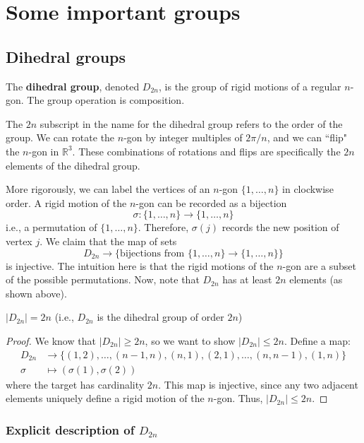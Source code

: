 \documentclass{article}
\theoremstyle{plain}
\newcommand{\R}{\mathbb{R}}
\begin{document}
\section{Some important groups}
\subsection{Dihedral groups}
\begin{definition}{}{}
The \textbf{dihedral group}, denoted $D_{2n}$, is the group of rigid motions of a regular $n$-gon. The group operation is composition.
\end{definition}
The $2n$ subscript in the name for the dihedral group refers to the order of the group. We can rotate the $n$-gon by integer multiples of $2\pi/n$, and we can ``flip" the $n$-gon in $\R^3$. These combinations of rotations and flips are specifically the $2n$ elements of the dihedral group.

More rigorously, we can label the vertices of an $n$-gon $\{1,\ldots,n\}$ in clockwise order. A rigid motion of the $n$-gon can be recorded as a bijection $$\sigma : \{1,\ldots,n\}\rightarrow\{1,\ldots,n\}$$
i.e., a permutation of $\{1,\ldots,n\}$. Therefore, $\sigma(j)$ records the new position of vertex $j$. We claim that the map of sets $$D_{2n}\rightarrow \{\text{bijections from } \{1,\ldots,n\} \rightarrow \{1,\ldots,n\}\}$$
is injective. The intuition here is that the rigid motions of the $n$-gon are a subset of the possible permutations. Now, note that $D_{2n}$ has at least $2n$ elements (as shown above).
\begin{theorem}{}{}
$|D_{2n}| = 2n$ (i.e., $D_{2n}$ is the dihedral group of order $2n$)
\end{theorem}
\begin{proof}
We know that $|D_{2n}| \ge 2n$, so we want to show $|D_{2n}| \le 2n$. Define a map:
\begin{align*}
D_{2n} &\rightarrow \{ (1,2),\ldots,(n-1,n), (n,1), (2,1), \ldots, (n,n-1), (1,n) \} \\
\sigma &\mapsto (\sigma(1), \sigma(2))
\end{align*}
where the target has cardinality $2n$. This map is injective, since any two adjacent elements uniquely define a rigid motion of the $n$-gon. Thus, $|D_{2n}| \le 2n$.
\end{proof}

\subsubsection{Explicit description of $D_{2n}$}
\end{document}

